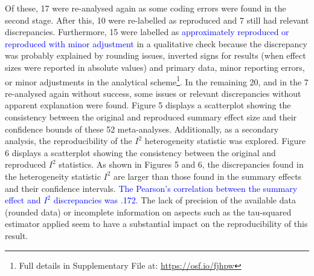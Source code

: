 \documentclass[
  ,man,floatsintext]{apa6}
\begin{document}
Of these, 17 were re-analysed again as some coding errors were found in the second stage. After this, 10 were re-labelled as reproduced and 7 still had relevant discrepancies. Furthermore, 15 were labelled as \textcolor{blue}{approximately reproduced or reproduced with minor adjustment} in a qualitative check because the discrepancy was probably explained by rounding issues, inverted signs for results (when effect sizes were reported in absolute values) and primary data, minor reporting errors, or minor adjustments in the analytical scheme\footnote{Full details in Supplementary File at: \url{https://osf.io/fjhpw}}. In the remaining 20, and in the 7 re-analysed again without success, some issues or relevant discrepancies without apparent explanation were found.
Figure 5 displays a scatterplot showing the consistency between the original and reproduced summary effect size and their confidence bounds of these 52 meta-analyses.
Additionally, as a secondary analysis, the reproducibility of the \(I^2\) heterogeneity statistic was explored. Figure 6 displays a scatterplot showing the consistency between the original and reproduced \(I^2\) statistics. As shown in Figures 5 and 6, the discrepancies found in the heterogeneity statistic \(I^2\) are larger than those found in the summary effects and their confidence intervals. \textcolor{blue}{The Pearson's correlation between the summary effect and $I^2$ discrepancies was .172.} The lack of precision of the available data (rounded data) or incomplete information on aspects such as the tau-squared estimator applied seem to have a substantial impact on the reproducibility of this result.
\end{document}
